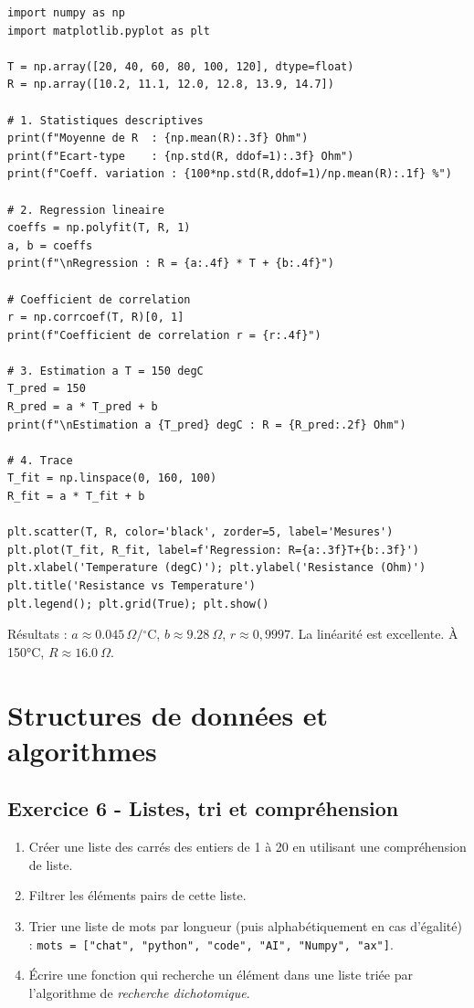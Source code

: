 \documentclass[12pt,a4paper]{article}
\begin{document}
\begin{boitecorrige}
\begin{lstlisting}
import numpy as np
import matplotlib.pyplot as plt

T = np.array([20, 40, 60, 80, 100, 120], dtype=float)
R = np.array([10.2, 11.1, 12.0, 12.8, 13.9, 14.7])

# 1. Statistiques descriptives
print(f"Moyenne de R  : {np.mean(R):.3f} Ohm")
print(f"Ecart-type    : {np.std(R, ddof=1):.3f} Ohm")
print(f"Coeff. variation : {100*np.std(R,ddof=1)/np.mean(R):.1f} %")

# 2. Regression lineaire
coeffs = np.polyfit(T, R, 1)
a, b = coeffs
print(f"\nRegression : R = {a:.4f} * T + {b:.4f}")

# Coefficient de correlation
r = np.corrcoef(T, R)[0, 1]
print(f"Coefficient de correlation r = {r:.4f}")

# 3. Estimation a T = 150 degC
T_pred = 150
R_pred = a * T_pred + b
print(f"\nEstimation a {T_pred} degC : R = {R_pred:.2f} Ohm")

# 4. Trace
T_fit = np.linspace(0, 160, 100)
R_fit = a * T_fit + b

plt.scatter(T, R, color='black', zorder=5, label='Mesures')
plt.plot(T_fit, R_fit, label=f'Regression: R={a:.3f}T+{b:.3f}')
plt.xlabel('Temperature (degC)'); plt.ylabel('Resistance (Ohm)')
plt.title('Resistance vs Temperature')
plt.legend(); plt.grid(True); plt.show()
\end{lstlisting}

Résultats : $a \approx \ensuremath{\num{0.045}\,\Omega/{}^\circ\text{C}}$, $b \approx \qty{9.28}{\Omega}$, $r \approx 0{,}9997$. La linéarité est excellente. À 150°C, $R\approx\qty{16.0}{\Omega}$.
\end{boitecorrige}

\section{Structures de données et algorithmes}

\subsection*{Exercice 6 - Listes, tri et compréhension \niveau{\facile}}

\begin{boiteexercice}
\begin{enumerate}
  \item Créer une liste des carrés des entiers de 1 à 20 en utilisant une compréhension de liste.
  \item Filtrer les éléments pairs de cette liste.
  \item Trier une liste de mots par longueur (puis alphabétiquement en cas d'égalité) : \texttt{mots = ["chat", "python", "code", "AI", "Numpy", "ax"]}.
  \item Écrire une fonction qui recherche un élément dans une liste triée par l'algorithme de \emph{recherche dichotomique}.
\end{enumerate}
\end{boiteexercice}
\end{document}
